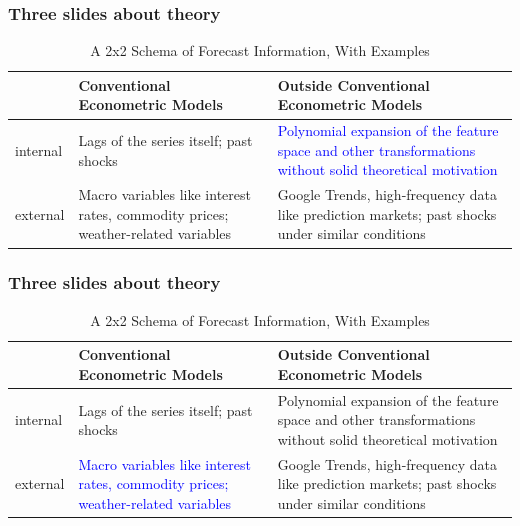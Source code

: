 \documentclass[9pt]{beamer}
\theoremstyle{definition}
\begin{document}
\begin{frame}\frametitle{Three slides about theory}
   
    \begin{table}[htb]
        \centering %
        \caption{A 2x2 Schema of Forecast Information, With Examples}
        \begin{tabular}{ | p{1cm} | p{4.8cm}| p{4.8cm} | } 
          \hline
          & Conventional Econometric Models & Outside Conventional Econometric Models\\ 
          \hline
          internal & Lags of the series itself; past shocks & \textcolor{blue}{Polynomial expansion of the feature space and other transformations without solid theoretical motivation} \\
          \hline
          external & Macro variables like interest rates, commodity prices; weather-related variables & Google Trends, high-frequency data like prediction markets; past shocks under similar conditions \\ 
          \hline
        \end{tabular}
      \end{table}
\end{frame}
\begin{frame}\frametitle{Three slides about theory}
   
    \begin{table}[htb]
        \centering %
        \caption{A 2x2 Schema of Forecast Information, With Examples}
        \begin{tabular}{ | p{1cm} | p{4.8cm}| p{4.8cm} | } 
          \hline
          & Conventional Econometric Models & Outside Conventional Econometric Models\\ 
          \hline
          internal &  Lags of the series itself; past shocks & Polynomial expansion of the feature space and other transformations without solid theoretical motivation \\
          \hline
          external & \textcolor{blue}{Macro variables like interest rates, commodity prices; weather-related variables} & Google Trends, high-frequency data like prediction markets; past shocks under similar conditions \\ 
          \hline
        \end{tabular}
      \end{table}
\end{frame}
\end{document}
